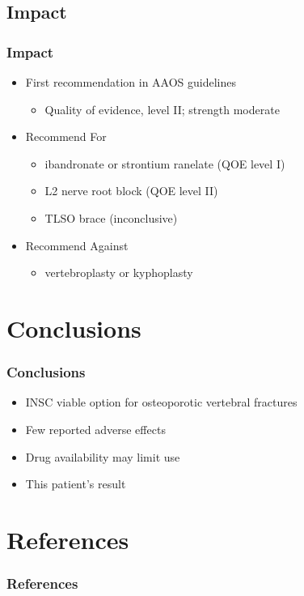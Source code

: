 \documentclass{beamer}
\begin{document}
\subsection{Impact}
\begin{frame}
	\frametitle{Impact}
	\begin{itemize}
		\item First recommendation in AAOS guidelines
		\begin{itemize}
			\item Quality of evidence, level II; strength moderate
		\end{itemize} 
		\item Recommend For
			\begin{itemize}
				\item ibandronate or strontium ranelate (QOE level I)
				\item L2 nerve root block (QOE level II)
				\item TLSO brace (inconclusive)
			\end{itemize}
		\item Recommend Against
			\begin{itemize}
				\item vertebroplasty or kyphoplasty
			\end{itemize}
	\end{itemize}
\end{frame}
\section{Conclusions}
\begin{frame}
	\frametitle{Conclusions}
	\begin{itemize}
		\item INSC viable option for osteoporotic vertebral fractures
		\item Few reported adverse effects
		\item Drug availability may limit use
		\item This patient's result
	\end{itemize}
\end{frame}
\section{References}
\begin{frame}
	\frametitle{References}
		\printbibliography
\end{frame}
\end{document}
